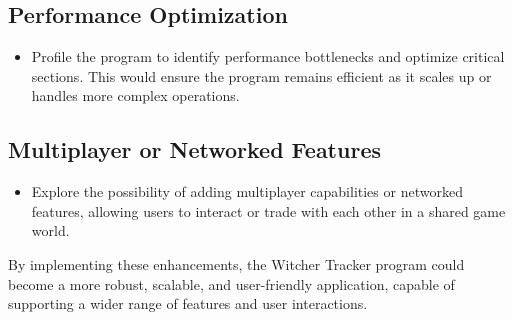 \documentclass{article}
\begin{document}
\subsection*{Performance Optimization}
\begin{itemize}
    \item Profile the program to identify performance bottlenecks and optimize critical sections. This would ensure the program remains efficient as it scales up or handles more complex operations.
\end{itemize}

\subsection*{Multiplayer or Networked Features}
\begin{itemize}
    \item Explore the possibility of adding multiplayer capabilities or networked features, allowing users to interact or trade with each other in a shared game world.
\end{itemize}

By implementing these enhancements, the Witcher Tracker program could become a more robust, scalable, and user-friendly application, capable of supporting a wider range of features and user interactions.
\end{document}

